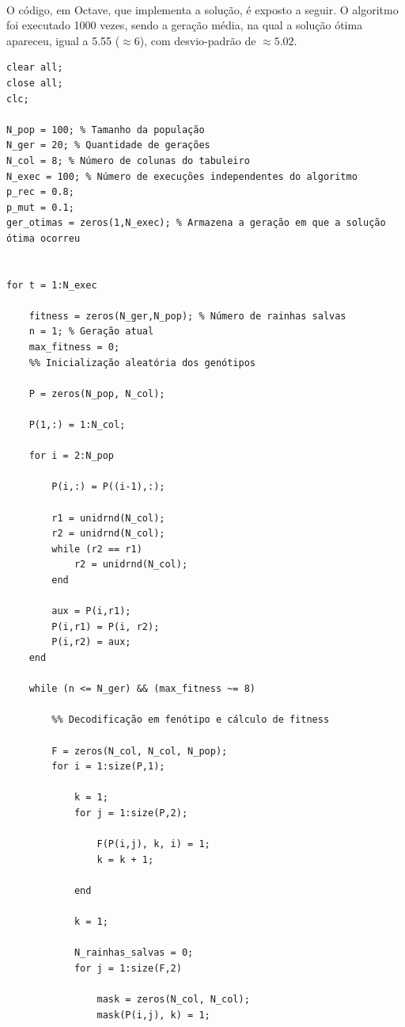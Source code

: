 \documentclass{report}
\begin{document}
	\paragraph{} O código, em Octave, que implementa a solução, é exposto a seguir. O algoritmo foi executado 1000 vezes, sendo a geração média, na qual a solução ótima apareceu, igual a 5.55 ($\approx 6$), com desvio-padrão de $\approx 5.02$. \\
	
	\begin{lstlisting}
clear all;
close all;
clc;

N_pop = 100; % Tamanho da população
N_ger = 20; % Quantidade de gerações
N_col = 8; % Número de colunas do tabuleiro
N_exec = 100; % Número de execuções independentes do algoritmo
p_rec = 0.8;
p_mut = 0.1;
ger_otimas = zeros(1,N_exec); % Armazena a geração em que a solução ótima ocorreu


for t = 1:N_exec

    fitness = zeros(N_ger,N_pop); % Número de rainhas salvas
    n = 1; % Geração atual
    max_fitness = 0;
    %% Inicialização aleatória dos genótipos

    P = zeros(N_pop, N_col);

    P(1,:) = 1:N_col;

    for i = 2:N_pop

        P(i,:) = P((i-1),:);

        r1 = unidrnd(N_col);
        r2 = unidrnd(N_col);
        while (r2 == r1)
            r2 = unidrnd(N_col);
        end
        
        aux = P(i,r1);
        P(i,r1) = P(i, r2);
        P(i,r2) = aux;
    end

    while (n <= N_ger) && (max_fitness ~= 8)

        %% Decodificação em fenótipo e cálculo de fitness

        F = zeros(N_col, N_col, N_pop);
        for i = 1:size(P,1);

            k = 1;
            for j = 1:size(P,2);
                
                F(P(i,j), k, i) = 1;
                k = k + 1;
                
            end
            
            k = 1;

            N_rainhas_salvas = 0;
            for j = 1:size(F,2)

                mask = zeros(N_col, N_col);
                mask(P(i,j), k) = 1;
                

\end{lstlisting}
\end{document}
